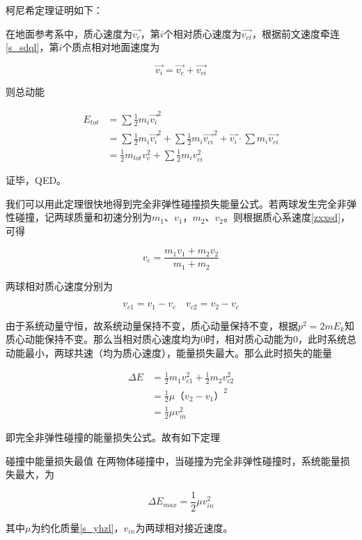 柯尼希定理证明如下：

在地面参考系中，质心速度为$\vec{v_c}$，第$i$个相对质心速度为$\vec{v_{ci}}$，根据前文速度牵连\eqref{s_sdql}，第$i$个质点相对地面速度为

$$\vec{v_i} = \vec{v_c} + \vec{v_{ci}}$$

则总动能

\begin{subequations}
\begin{align*}
E_{tot} &= \sum \frac{1}{2} m_i \vec{v_i}^2 \\
&= \sum \frac{1}{2} m_i \vec{v_i}^2 + \sum \frac{1}{2} m_i \vec{v_{ci}}^2 + \vec{v_i} \cdot \sum m_i \vec{v_{ci}} \\
&= \frac{1}{2} m_{tot} v_c^2 + \sum \frac{1}{2} m_i v_{ci}^2
\end{align*}
\end{subequations}

证毕，QED。 

我们可以用此定理很快地得到完全非弹性碰撞损失能量公式。若两球发生完全非弹性碰撞，记两球质量和初速分别为$m_1$、$v_1$，$m_2$、$v_2$。则根据质心系速度\eqref{zxxsd}，可得

$$v_c = \frac{m_1 v_1 + m_2 v_2}{m_1+m_2}$$

两球相对质心速度分别为

$$v_{c1} = v_1 - v_c \quad v_{c2} = v_2 - v_c$$

由于系统动量守恒，故系统动量保持不变，质心动量保持不变，根据$p^2 = 2 m E_k$知质心动能保持不变。那么当相对质心速度均为$0$时，相对质心动能为$0$，此时系统总动能最小，两球共速（均为质心速度），能量损失最大。那么此时损失的能量

\begin{subequations}
\begin{align*}
\Delta E &= \frac{1}{2} m_1 v_{c1}^2 + \frac{1}{2} m_2 v_{c2}^2 \\
&= \frac{1}{2} \mu （v_2 - v_1）^2 \\
&= \frac{1}{2} \mu v_{in}^2
\end{align*}
\end{subequations}

即完全非弹性碰撞的能量损失公式。故有如下定理

\begin{theo}{碰撞中能量损失最值}{}
在两物体碰撞中，当碰撞为完全非弹性碰撞时，系统能量损失最大，为

$$\Delta E_{max} = \frac{1}{2} \mu v_{in}^2$$

其中$\mu$为约化质量\eqref{s_yhzl}，$v_{in}$为两球相对接近速度。
\end{theo}


